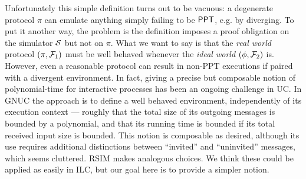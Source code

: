 

Unfortunately this simple definition turns out to be vacuous: a degenerate protocol $\pi$ can emulate anything simply failing to be $\text{\textsf{PPT}}$, e.g. by diverging. To put it another way, the problem is the definition imposes a proof obligation on the simulator $\mathcal{{S}}$ but not on $\pi$.
What we want to say is that the \emph{real world} protocol $(\pi, \mathcal{{F}}_1)$ must be well behaved whenever the \emph{ideal world} $(\phi, \mathcal{{F}}_2)$ is.
However, even a reasonable protocol can result in non-PPT executions if paired with a divergent environment.
In fact, giving a precise but composable notion of polynomial-time for interactive processes has been an ongoing challenge in UC. In GNUC the approach is to define a well behaved environment, independently of its execution context --- roughly that the total size of its outgoing messages is bounded by a polynomial, and that its running time is bounded if its total received input size is bounded. This notion is composable as desired, although its use requires additional distinctions between ``invited'' and ``uninvited'' messages, which seems cluttered. RSIM makes analogous choices. We think these could be applied as easily in ILC, but our goal here is to provide a simpler notion.

